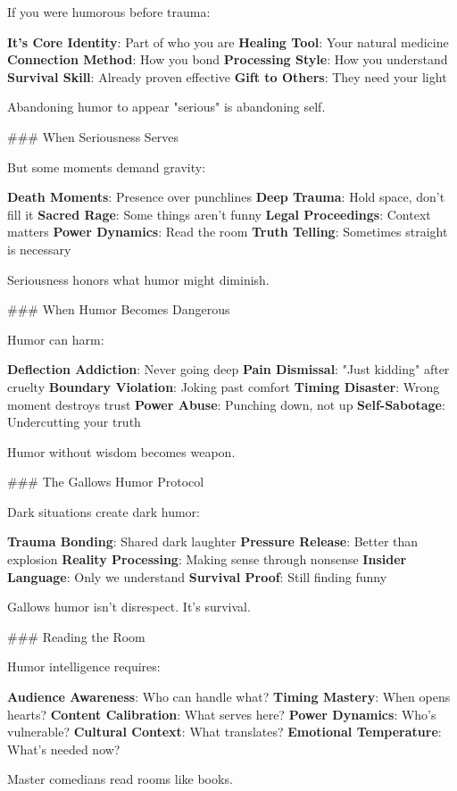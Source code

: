 \documentclass[12pt]{book}
\begin{document}
If you were humorous before trauma:

\textbf{It's Core Identity}: Part of who you are
\textbf{Healing Tool}: Your natural medicine
\textbf{Connection Method}: How you bond
\textbf{Processing Style}: How you understand
\textbf{Survival Skill}: Already proven effective
\textbf{Gift to Others}: They need your light

Abandoning humor to appear "serious" is abandoning self.

\#\#\# When Seriousness Serves

But some moments demand gravity:

\textbf{Death Moments}: Presence over punchlines
\textbf{Deep Trauma}: Hold space, don't fill it
\textbf{Sacred Rage}: Some things aren't funny
\textbf{Legal Proceedings}: Context matters
\textbf{Power Dynamics}: Read the room
\textbf{Truth Telling}: Sometimes straight is necessary

Seriousness honors what humor might diminish.

\#\#\# When Humor Becomes Dangerous

Humor can harm:

\textbf{Deflection Addiction}: Never going deep
\textbf{Pain Dismissal}: "Just kidding" after cruelty
\textbf{Boundary Violation}: Joking past comfort
\textbf{Timing Disaster}: Wrong moment destroys trust
\textbf{Power Abuse}: Punching down, not up
\textbf{Self-Sabotage}: Undercutting your truth

Humor without wisdom becomes weapon.

\#\#\# The Gallows Humor Protocol

Dark situations create dark humor:

\textbf{Trauma Bonding}: Shared dark laughter
\textbf{Pressure Release}: Better than explosion
\textbf{Reality Processing}: Making sense through nonsense
\textbf{Insider Language}: Only we understand
\textbf{Survival Proof}: Still finding funny

Gallows humor isn't disrespect. It's survival.

\#\#\# Reading the Room

Humor intelligence requires:

\textbf{Audience Awareness}: Who can handle what?
\textbf{Timing Mastery}: When opens hearts?
\textbf{Content Calibration}: What serves here?
\textbf{Power Dynamics}: Who's vulnerable?
\textbf{Cultural Context}: What translates?
\textbf{Emotional Temperature}: What's needed now?

Master comedians read rooms like books.
\end{document}
